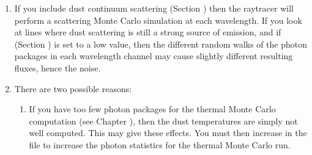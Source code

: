 \documentclass[letterpaper,10pt,english]{sphinxmanual}
\begin{document}
\begin{enumerate}
\item {} 

If you include dust continuum scattering (Section {\hyperref[\detokenize{dustradtrans:sec-scattering}]{}}) then
the ray\sphinxhyphen{}tracer will perform a scattering Monte Carlo simulation at each
wavelength. If you look at lines where dust scattering is still a strong
source of emission, and if  (Section
{\hyperref[\detokenize{dustradtrans:sec-scat-monte-carlo}]{}}) is set to a low value, then the different random
walks of the photon packages in each wavelength channel may cause slightly
different resulting fluxes, hence the noise.

\item {} 

There are two possible reasons:
\begin{enumerate}
%
\item {} 
 If you have too few photon
packages for the thermal Monte Carlo computation (see Chapter
{\hyperref[\detokenize{dustradtrans:chap-dust-transfer}]{}}), then the dust temperatures are simply not well
computed. This may give these effects. You must then increase  in
the  file to increase the photon statistics for the thermal
Monte Carlo run.


\end{enumerate}
\end{enumerate}
\end{document}
